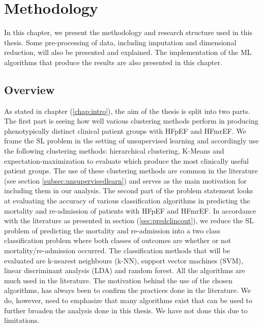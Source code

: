 \documentclass[../thesis.tex]{subfiles}
\begin{document}
\chapter{Methodology}
\label{chap:method}

\noindent In this chapter, we present the methodology and research structure used in this thesis. Some pre-processing of data, including imputation and dimensional reduction, will also be presented and explained. The implementation of the ML algorithms that produce the results are also presented in this chapter.

\section{Overview}
\label{sec:overview}

\noindent As stated in chapter (\ref{chap:intro}), the aim of the thesis is split into two parts. The first part is seeing how well various clustering methods perform in producing phenotypically distinct clinical patient groups with HFpEF and HFmrEF. We frame the SL problem in the setting of unsupervised learning and accordingly use the following clustering methods: hierarchical clustering, K-Means and expectation-maximization to evaluate which produce the most clinically useful patient groups. The use of these clustering methods are common in the literature (see section \ref{subsec:unsupervisedlearn}) and serves as the main motivation for including them in our analysis. The second part of the problem statement looks at evaluating the accuracy of various classification algorithms in predicting the mortality and re-admission of patients with HFpEF and HFmrEF. In accordance with the literature as presented in section (\ref{sec:predclincout}), we reduce the SL problem of predicting the mortality and re-admission into a two class classification problem where both classes of outcomes are whether or not mortality/re-admission occurred. The classification methods that will be evaluated are k-nearest neighbours (k-NN), support vector machines (SVM), linear discriminant analysis (LDA) and random forest. All the algorithms are much used in the literature. The motivation behind the use of the chosen algorithms, has always been to confirm the practices done in the literature. We do, however, need to emphasize that many algorithms exist that can be used to further broaden the analysis done in this thesis. We have not done this due to limitations.


\end{document}
